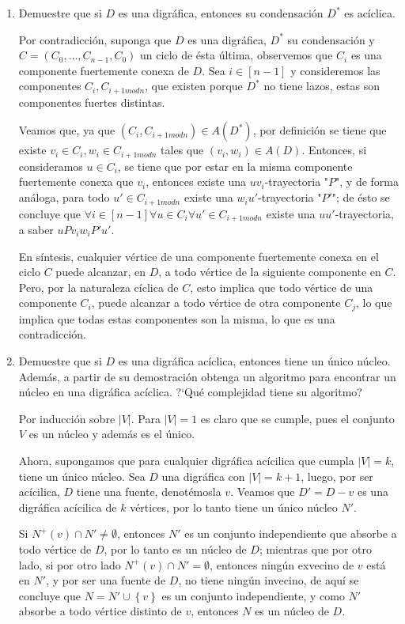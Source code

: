 \documentclass{article}
\newcommand{\set}[1]{\left\{ #1 \right\}}
\begin{document}
\begin{enumerate}
  \item Demuestre que si $D$ es una digr\'afica, entonces su
    condensaci\'on $D^\ast$ es ac\'iclica.

    Por contradicción, suponga que $D$ es una digráfica, $D^\ast$ su condensación y $C=(C_0,\dots,C_{n-1},C_0)$ un ciclo de ésta última, observemos que $C_i$ es una componente fuertemente conexa de $D$. Sea $i\in[n-1]$ y consideremos las componentes $C_i,C_{i+1 mod n}$, que existen porque $D^\ast$ no tiene lazos, estas son componentes fuertes distintas.

    Veamos que, ya que $(C_i, C_{i+1 modn})\in A(D^\ast)$, por definición se tiene que existe $v_i\in C_i, w_i\in C_{i+1 modn}$ tales que $(v_i,w_i)\in A(D)$. Entonces, si consideramos $u\in C_i$, se tiene que por estar en la misma componente fuertemente conexa que $v_i$, entonces existe una $uv_i$-trayectoria "$P$", y de forma análoga, para todo $u'\in C_{i+1 modn}$ existe una $w_iu'$-trayectoria "$P'$"; de ésto se concluye que $\forall i\in[n-1]\forall u\in C_i \forall u'\in C_{i+1 modn}$ existe una $uu'$-trayectoria, a saber $uPv_iw_iP'u'$.

  En síntesis, cualquier vértice de una componente fuertemente conexa en el ciclo $C$ puede alcanzar, en $D$, a todo vértice de la siguiente componente en $C$. Pero, por la naturaleza cíclica de $C$, esto implica que todo vértice de una componente $C_i$, puede alcanzar a todo vértice de otra componente $C_j$, lo que implica que todas estas componentes son la misma, lo que es una contradicción.

  \item Demuestre que si $D$ es una digr\'afica ac\'iclica, entonces
    tiene un \'unico n\'ucleo.   Adem\'as, a partir de su demostraci\'on
    obtenga un algoritmo para encontrar un n\'ucleo en una digr\'afica
    ac\'iclica.   ?`Qu\'e complejidad tiene su algoritmo?

    Por inducción sobre $|V|$. Para $|V|=1$ es claro que se cumple, pues el conjunto $V$ es un núcleo y además es el único.

    Ahora, supongamos que para cualquier digráfica acícilica que cumpla $|V|=k$, tiene un único núcleo. Sea $D$ una digráfica con $|V|=k+1$, luego, por ser acícilica, $D$ tiene una fuente, denotémosla $v$. Veamos que $D'=D-v$ es una digráfica acícilica de $k$ vértices, por lo tanto tiene un único núcleo $N'$.

    Si $N^+(v)\cap N'\neq\emptyset$, entonces $N'$ es un conjunto independiente que absorbe a todo vértice de $D$, por lo tanto es un núcleo de $D$; mientras que por otro lado, si por otro lado $N^+(v)\cap N'=\emptyset$, entonces ningún exvecino de $v$ está en $N'$, y por ser una fuente de $D$, no tiene ningún invecino, de aquí se concluye que $N=N'\cup\set{v}$ es un conjunto independiente, y como $N'$ absorbe a todo vértice distinto de $v$, entonces $N$ es un núcleo de $D$.


\end{enumerate}
\end{document}

